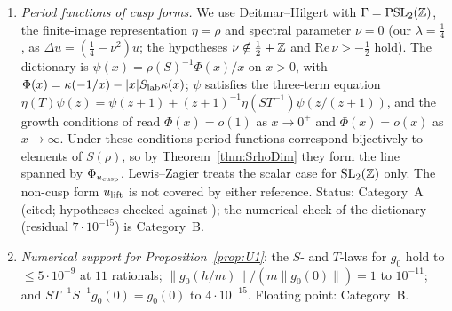 \begin{remark}\label{rem:uniqB}
\begin{enumerate}[label=(\alph*)]
\item \emph{Period functions of cusp forms.} We use Deitmar--Hilgert \cite[Thm.~3.3 and Thm.~4.4]{DH} with $\Gamma=\mathrm{PSL}_2(\mathbb{Z})$, the finite-image representation $\eta=\rho$ and spectral parameter $\nu=0$ (our $\lambda=\tfrac14$, as $\Delta u=(\tfrac14-\nu^2)u$; the hypotheses $\nu\notin\tfrac12+\mathbb{Z}$ and $\mathrm{Re}\,\nu>-\tfrac12$ hold). The dictionary is $\psi(x)=\rho(S)^{-1}\Phi(x)/x$ on $x>0$, with $\Phi(x)=\kappa(-1/x)-|x|S_{\rm lab}\kappa(x)$; $\psi$ satisfies the three-term equation $\eta(T)\psi(z)=\psi(z+1)+(z+1)^{-1}\eta(ST^{-1})\psi(z/(z+1))$, and the growth conditions of \cite[Thm.~4.4]{DH} read $\Phi(x)=o(1)$ as $x\to0^+$ and $\Phi(x)=o(x)$ as $x\to\infty$. Under these conditions period functions correspond bijectively to elements of $S(\rho)$, so by Theorem~\ref{thm:SrhoDim} they form the line spanned by $\Phi_{u_{\rm cusp}}$. Lewis--Zagier \cite{LZ} treats the scalar case for $\mathrm{SL}_2(\mathbb{Z})$ only. The non-cusp form $u_{\rm lift}$ is not covered by either reference. Status: Category~A (cited; hypotheses checked against \cite{DH}); the numerical check of the dictionary (residual $7\cdot10^{-15}$) is Category~B.
\item \emph{Numerical support for Proposition~\ref{prop:U1}}: the $S$- and $T$-laws for $g_0$ hold to $\le5\cdot10^{-9}$ at $11$ rationals; $\|g_0(h/m)\|/(m\|g_0(0)\|)=1$ to $10^{-11}$; and $ST^{-1}S^{-1}g_0(0)=g_0(0)$ to $4\cdot10^{-15}$. Floating point: Category~B.
\end{enumerate}
\end{remark}
